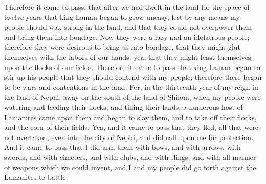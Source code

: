 Therefore it came to pass, that after we had dwelt in the land for the space of twelve years that king Laman began to grow uneasy, lest by any means my people should wax strong in the land, and that they could not overpower them and bring them into bondage.
\bverse \iffalse Now they were a lazy and an idolatrous people; therefore they were desirous to bring us into bondage, that they might glut themselves with the labors of our hands; yea, that they might feast themselves upon the flocks of our fields. \fi
Now they were a lazy and an idolatrous people; therefore they were desirous to bring us into bondage, that they might glut themselves with the labors of our hands; yea, that they might feast themselves upon the flocks of our fields.
\bverse \iffalse Therefore it came to pass that king Laman began to stir up his people that they should contend with my people; therefore there began to be wars and contentions in the land. \fi
Therefore it came to pass that king Laman began to stir up his people that they should contend with my people; therefore there began to be wars and contentions in the land.
\bverse \iffalse For, in the thirteenth year of my reign in the land of Nephi, away on the south of the land of Shilom, when my people were watering and feeding their flocks, and tilling their lands, a numerous host of Lamanites came upon them and began to slay them, and to take off their flocks, and the corn of their fields. \fi
For, in the thirteenth year of my reign in the land of Nephi, away on the south of the land of Shilom, when my people were watering and feeding their flocks, and tilling their lands, a numerous host of Lamanites came upon them and began to slay them, and to take off their flocks, and the corn of their fields.
\bverse \iffalse Yea, and it came to pass that they fled, all that were not overtaken, even into the city of Nephi, and did call upon me for protection. \fi
Yea, and it came to pass that they fled, all that were not overtaken, even into the city of Nephi, and did call upon me for protection.
\bverse \iffalse And it came to pass that I did arm them with bows, and with arrows, with swords, and with cimeters, and with clubs, and with slings, and with all manner of weapons which we could invent, and I and my people did go forth against the Lamanites to battle. \fi
And it came to pass that I did arm them with bows, and with arrows, with swords, and with cimeters, and with clubs, and with slings, and with all manner of weapons which we could invent, and I and my people did go forth against the Lamanites to battle.
